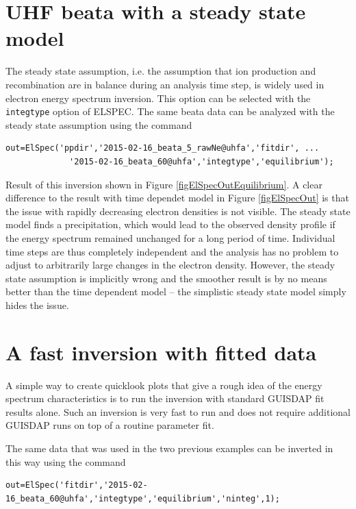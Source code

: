 \documentclass[12pt,a4paper]{report}
\begin{document}
\section{UHF beata with a steady state model}

The steady state assumption, i.e. the assumption that ion production and recombination are in balance during an analysis time step, is widely used in electron energy spectrum inversion. This option can be selected with the \verb|integtype| option of ELSPEC. The same beata data can be analyzed with the steady state assumption using the command
\begin{lstlisting}[style=myMATLAB]
out=ElSpec('ppdir','2015-02-16_beata_5_rawNe@uhfa','fitdir', ...
             '2015-02-16_beata_60@uhfa','integtype','equilibrium');
\end{lstlisting}

Result of this inversion shown in Figure \ref{figElSpecOutEquilibrium}. A clear difference to the result with time dependet model in Figure \ref{figElSpecOut} is that the issue with rapidly decreasing electron densities is not visible. The steady state model finds a precipitation, which would lead to the observed density profile if the energy spectrum remained unchanged for a long period of time. Individual time steps are thus completely independent and the analysis has no problem to adjust to arbitrarily large changes in the electron density. However, the steady state assumption is implicitly wrong and the smoother result is by no means better than the time dependent model -- the simplistic steady state model simply hides the issue.

\section{A fast inversion with fitted data}

A simple way to create quicklook plots that give a rough idea of the energy spectrum characteristics is to run the inversion with standard GUISDAP fit results alone. Such an inversion is very fast to run and does not require additional GUISDAP runs on top of a routine parameter fit. 

The same data that was used in the two previous examples can be inverted in this way using the command
\begin{lstlisting}[style=myMATLAB]
out=ElSpec('fitdir','2015-02-16_beata_60@uhfa','integtype','equilibrium','ninteg',1);
\end{lstlisting}
\end{document}
